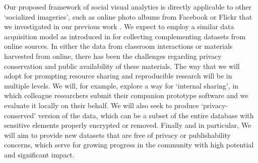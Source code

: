 Our proposed framework of social visual analytics is directly applicable to other `socialized imageries', such as online photo albums from Facebook or Flickr that we investigated in our previous work \cite{Stone2008,Stone2010}. We expect to employ a similar data acquisition model as introduced in \cite{Stone2008,Stone2010} for collecting complementing datasets from online sources.  In either the data from classroom interactions or materials harvested from online, there has been the challenges regarding privacy conservation and public availability of these materials. The way that we will adopt for prompting resource sharing and reproducible research will be in multiple levels. We will, for example, explore a way for `internal sharing', in which colleague researchers submit their companion prototype software and we evaluate it locally on their behalf. We will also seek to produce `privacy-conserved' version of the data, which can be a subset of the entire database with sensitive elements properly encrypted or removed. Finally and in particular, We will aim to provide new datasets that are free of privacy or publishability concerns, which serve for growing progress in the community with high potential and significant impact.









